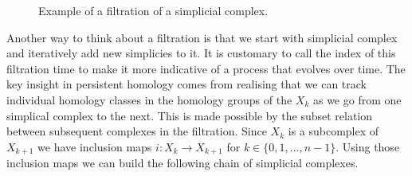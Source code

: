 \begin{figure}[h]
    \qquad
    \caption{Example of a filtration of a simplicial complex.}%
    \label{fig:example-filtration}%
\end{figure}

%

Another way to think about a filtration is that we start with simplicial complex and iteratively add new simplicies to it. It is customary to call the index of this filtration time to make it more indicative of a process that evolves over time. The key insight in persistent homology comes from realising that we can track individual homology classes in the homology groups of the $X_k$ as we go from one simplical complex to the next. This is made possible by the subset relation between subsequent complexes in the filtration. Since $X_k$ is a subcomplex of $X_{k+1}$ we have inclusion maps $i: X_{k} \to X_{k+1}$ for $k \in \{0, 1, ..., n - 1\}$. Using those inclusion maps we can build the following chain of simplicial complexes.

